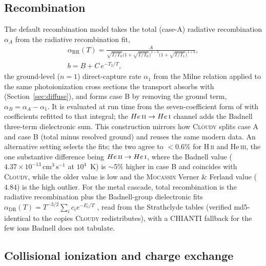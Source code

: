 \documentclass[twocolumn,linenumbers]{aastex702}
\newcommand{\HII}{H\,\textsc{ii}}
\newcommand{\HeI}{He\,\textsc{i}}
\newcommand{\HeII}{He\,\textsc{ii}}
\newcommand{\HeIII}{He\,\textsc{iii}}
\newcommand{\cmc}{\mathrm{cm^{3}\,s^{-1}}}
\begin{document}
\subsection{Recombination}
\label{sec:recomb}

The default recombination model takes the total (case-A) radiative
recombination $\alpha_A$ from the \citet{badnell2006} radiative
recombination fit,
\begin{gather}
  \alpha_{\mathrm{RR}}(T) =
  \frac{A}{\sqrt{T/T_0}\big(1+\sqrt{T/T_0}\big)^{1-b}
           \big(1+\sqrt{T/T_1}\big)^{1+b}},
  \nonumber\\
  b = B + C\,e^{-T_2/T},
  \label{eq:badnellrr}
\end{gather}%
the ground-level ($n=1$) direct-capture rate $\alpha_1$ from the Milne
relation applied to the same photoionization cross sections the transport
absorbs with (Section~\ref{sec:diffuse}), and forms case B by
removing the ground term, $\alpha_B = \alpha_A - \alpha_1$.  It is
evaluated at run time from the seven-coefficient form of \citet{mao2016}
with coefficients refitted to that integral; the $\HeII\to\HeI$ channel
adds the Badnell three-term dielectronic sum.  This
construction mirrors how \textsc{Cloudy} splits case A and case B (total
minus resolved ground) and reuses the same modern data.  An alternative
setting selects the \citet{huignedin1997} fits; the two agree to $<$0.6\% for
\HII{} and \HeIII{}, the one substantive difference being
$\HeII\to\HeI$, where the Badnell value ($4.37\times10^{-13}\,\cmc$ at
$10^4$~K) is $\sim$5\% higher in case B and coincides with
\textsc{Cloudy}, while the older \citet{huignedin1997} value is low and the
\textsc{Mocassin} Verner \& Ferland value ($4.84$) is the high outlier.
For the metal cascade, total recombination is the \citet{badnell2006}
radiative recombination plus the Badnell-group dielectronic fits
$\alpha_{\mathrm{DR}}(T) = T^{-3/2}\sum_i c_i e^{-E_i/T}$
\citep{badnell2003}, read from the Strathclyde tables (verified md5-identical
to the copies \textsc{Cloudy} redistributes), with a CHIANTI fallback for
the few ions Badnell does not tabulate.

\subsection{Collisional ionization and charge exchange}
\label{sec:ci}
\end{document}
